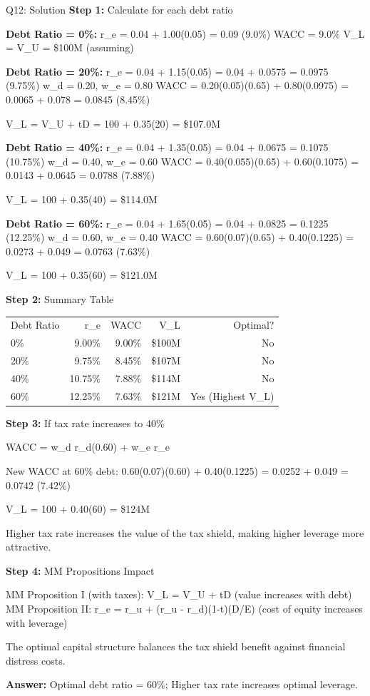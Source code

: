 \documentclass{beamer}
\renewcommand{\scriptsize}{\fontsize{6pt}{7pt}\selectfont}
\begin{document}
	\begin{frame}{Q12: Solution}
		\scriptsize
		\textbf{Step 1:} Calculate for each debt ratio
		
		\textbf{Debt Ratio = 0\%:}
		r\_e = 0.04 + 1.00(0.05) = 0.09 (9.0\%)
		WACC = 9.0\%
		V\_L = V\_U = \$100M (assuming)
		
		\textbf{Debt Ratio = 20\%:}
		r\_e = 0.04 + 1.15(0.05) = 0.04 + 0.0575 = 0.0975 (9.75\%)
		w\_d = 0.20, w\_e = 0.80
		WACC = 0.20(0.05)(0.65) + 0.80(0.0975) = 0.0065 + 0.078 = 0.0845 (8.45\%)
		
		V\_L = V\_U + tD = 100 + 0.35(20) = \$107.0M
		
		\textbf{Debt Ratio = 40\%:}
		r\_e = 0.04 + 1.35(0.05) = 0.04 + 0.0675 = 0.1075 (10.75\%)
		w\_d = 0.40, w\_e = 0.60
		WACC = 0.40(0.055)(0.65) + 0.60(0.1075) = 0.0143 + 0.0645 = 0.0788 (7.88\%)
		
		V\_L = 100 + 0.35(40) = \$114.0M
		
		\textbf{Debt Ratio = 60\%:}
		r\_e = 0.04 + 1.65(0.05) = 0.04 + 0.0825 = 0.1225 (12.25\%)
		w\_d = 0.60, w\_e = 0.40
		WACC = 0.60(0.07)(0.65) + 0.40(0.1225) = 0.0273 + 0.049 = 0.0763 (7.63\%)
		
		V\_L = 100 + 0.35(60) = \$121.0M
		
		\vspace{2pt}
		\textbf{Step 2:} Summary Table
		
		\begin{tabular}{lrrrr}
			Debt Ratio & r\_e & WACC & V\_L & Optimal? \\
			0\% & 9.00\% & 9.00\% & \$100M & No \\
			20\% & 9.75\% & 8.45\% & \$107M & No \\
			40\% & 10.75\% & 7.88\% & \$114M & No \\
			60\% & 12.25\% & 7.63\% & \$121M & Yes (Highest V\_L) \\
		\end{tabular}
		
		\vspace{2pt}
		\textbf{Step 3:} If tax rate increases to 40\%
		
		WACC = w\_d r\_d(0.60) + w\_e r\_e
		
		New WACC at 60\% debt: 0.60(0.07)(0.60) + 0.40(0.1225) = 0.0252 + 0.049 = 0.0742 (7.42\%)
		
		V\_L = 100 + 0.40(60) = \$124M
		
		Higher tax rate increases the value of the tax shield, making higher leverage more attractive.
		
		\textbf{Step 4:} MM Propositions Impact
		
		MM Proposition I (with taxes): V\_L = V\_U + tD (value increases with debt)
		MM Proposition II: r\_e = r\_u + (r\_u - r\_d)(1-t)(D/E) (cost of equity increases with leverage)
		
		The optimal capital structure balances the tax shield benefit against financial distress costs.
		
		\textbf{Answer:} Optimal debt ratio = 60\%; Higher tax rate increases optimal leverage.
	\end{frame}
	
\end{document}
